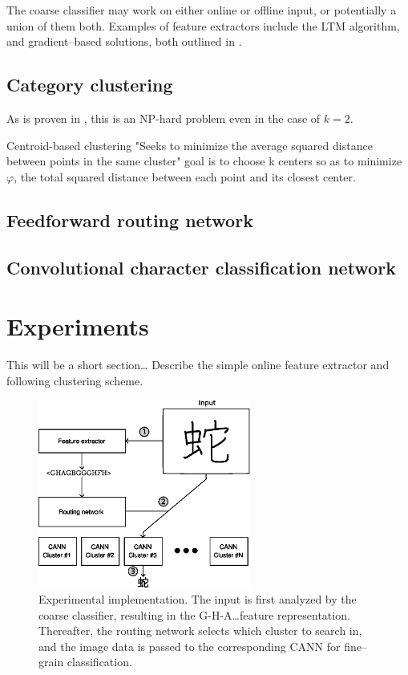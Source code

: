 \documentclass[10pt,conference,a4paper]{IEEEtran}
\begin{document}
	The coarse classifier may work on either online or offline input, or potentially a union of them both.
	Examples of feature extractors include the LTM algorithm, and gradient--based solutions, both outlined in \cite{tanaka1999hybrid}.



	\subsection{Category clustering}

	As is proven in \cite{drineas2004clustering}, this is an NP-hard problem even in the case of $k = 2$. 

	Centroid-based clustering
	"Seeks to minimize the average squared distance between points in the same cluster"
	goal is to choose k centers so as to minimize $\varphi$, the total squared distance between each point and its closest center.

	\subsection{Feedforward routing network}


	\subsection{Convolutional character classification network}


	\section{Experiments}
	\label{sec:experiments}

	This will be a short section\ldots
	Describe the simple online feature extractor and following clustering scheme.

	\begin{figure}
		\centering
		\includegraphics[width=2.75in]{./fig/experimental-implementation.eps}
		\caption{Experimental implementation. The input is first analyzed by the coarse classifier, resulting in the G-H-A\ldots feature representation.
		Thereafter, the routing network selects which cluster to search in, and the image data is passed to the corresponding CANN for fine--grain classification.}
		\label{fig_experimental_implementation}
	\end{figure}
\end{document}

